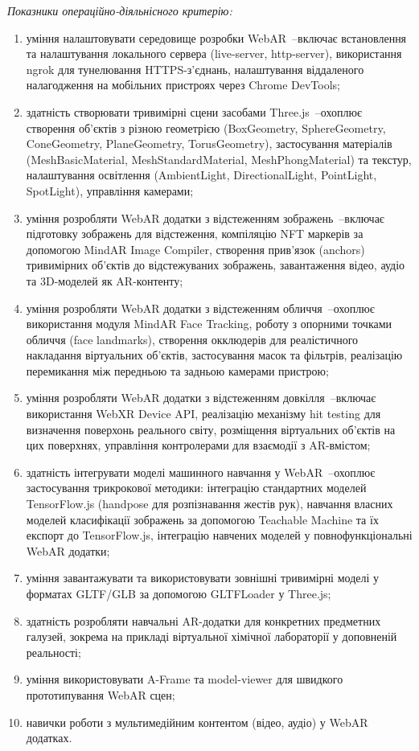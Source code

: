 \textit{Показники операційно-діяльнісного критерію:}
\begin{enumerate}
\item уміння налаштовувати середовище розробки WebAR~--включає встановлення та налаштування локального сервера (live-server, http-server), використання ngrok для тунелювання HTTPS-з'єднань, налаштування віддаленого налагодження на мобільних пристроях через Chrome DevTools;
\item здатність створювати тривимірні сцени засобами Three.js~--охоплює створення об'єктів з різною геометрією (BoxGeometry, SphereGeometry, ConeGeometry, PlaneGeometry, TorusGeometry), застосування матеріалів (MeshBasicMaterial, MeshStandardMaterial, MeshPhongMaterial) та текстур, налаштування освітлення (AmbientLight, DirectionalLight, PointLight, SpotLight), управління камерами;
\item уміння розробляти WebAR додатки з відстеженням зображень~--включає підготовку зображень для відстеження, компіляцію NFT маркерів за допомогою MindAR Image Compiler, створення прив'язок (anchors) тривимірних об'єктів до відстежуваних зображень, завантаження відео, аудіо та 3D-моделей як AR-контенту;
\item уміння розробляти WebAR додатки з відстеженням обличчя~--охоплює використання модуля MindAR Face Tracking, роботу з опорними точками обличчя (face landmarks), створення окклюдерів для реалістичного накладання віртуальних об'єктів, застосування масок та фільтрів, реалізацію перемикання між передньою та задньою камерами пристрою;
\item уміння розробляти WebAR додатки з відстеженням довкілля~--включає використання WebXR Device API, реалізацію механізму hit testing для визначення поверхонь реального світу, розміщення віртуальних об'єктів на цих поверхнях, управління контролерами для взаємодії з AR-вмістом;
\item здатність інтегрувати моделі машинного навчання у WebAR~--охоплює застосування трикрокової методики: інтеграцію стандартних моделей TensorFlow.js (handpose для розпізнавання жестів рук), навчання власних моделей класифікації зображень за допомогою Teachable Machine та їх експорт до TensorFlow.js, інтеграцію навчених моделей у повнофункціональні WebAR додатки;
\item уміння завантажувати та використовувати зовнішні тривимірні моделі у форматах GLTF/GLB за допомогою GLTFLoader у Three.js;
\item здатність розробляти навчальні AR-додатки для конкретних предметних галузей, зокрема на прикладі віртуальної хімічної лабораторії у доповненій реальності;
\item уміння використовувати A-Frame та model-viewer для швидкого прототипування WebAR сцен;
\item навички роботи з мультимедійним контентом (відео, аудіо) у WebAR додатках.
\end{enumerate}

